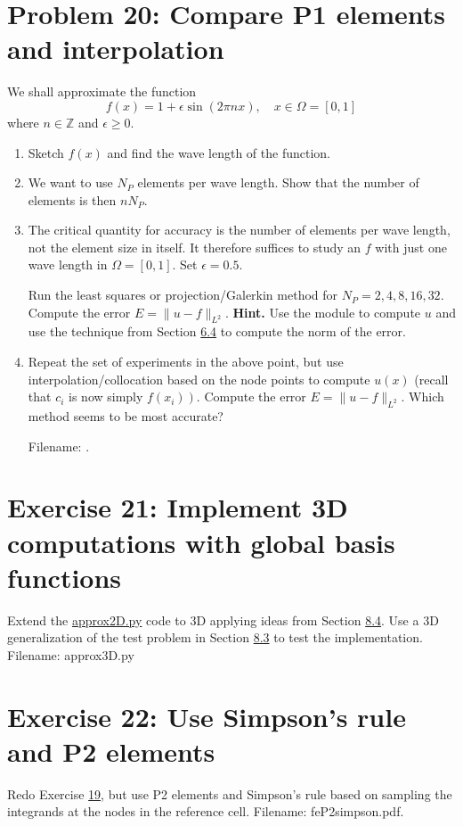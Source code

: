 \documentclass[../main.tex]{subfiles}
\begin{document}
	\section*{Problem 20: Compare P1 elements and interpolation}
	\label{sec:sec_10_20}
	\noindent We shall approximate the function
	$$
	f(x)=1+\epsilon \sin (2 \pi n x), \quad x \in \Omega=[0,1]
	$$
	where $n \in \mathbb{Z}$ and $\epsilon \geq 0$.
	\begin{enumerate}[label=(\alph*)]
		\item Sketch $f(x)$ and find the wave length of the function.
		\item We want to use $N_{P}$ elements per wave length. Show that the number of elements is then $n N_{P}$.
		\item The critical quantity for accuracy is the number of elements per wave length, not the element size in itself. It therefore suffices to study an $f$ with just one wave length in $\Omega=[0,1]$. Set $\epsilon=0.5$.
		
		Run the least squares or projection/Galerkin method for $N_{P}=2,4,8,16,32$. Compute the error $E=\|u-f\|_{L^{2}}$.
		\bigbreak
		\textbf{Hint.} Use the   module to compute $u$ and use the technique from Section \hyperref[sec:sec_6_4]{6.4} to compute the norm of the error.
		\item Repeat the set of experiments in the above point, but use interpolation/collocation based on the node points to compute $u(x)$ (recall that $c_{i}$ is now simply $\left.f\left(x_{i}\right)\right)$. Compute the error $E=\|u-f\|_{L^{2}}$. Which method seems to be most accurate?
		
		Filename:  .
	\end{enumerate}
	\bigbreak
	\section*{Exercise 21: Implement 3D computations with global basis functions}
	\label{sec:sec_10_21}
	\noindent Extend the \href{http://tinyurl.com/jvzzcfn/fem/approx2D.py}{approx2D.py} code to 3D applying ideas from Section \hyperref[sec:sec_8_4]{8.4}. Use a
	3D generalization of the test problem in Section \hyperref[sec:sec_8_3]{8.3} to test the implementation.
	Filename: approx3D.py
	\bigbreak
	\section*{Exercise 22: Use Simpson's rule and P2 elements}
	\label{sec:sec_10_22}
	\noindent Redo Exercise \hyperref[sec:sec_10_19]{19}, but use P2 elements and Simpson's rule based on sampling
	the integrands at the nodes in the reference cell.
	Filename: fe\textunderscore P2\textunderscore simpson.pdf.

\clearpage
\end{document}

